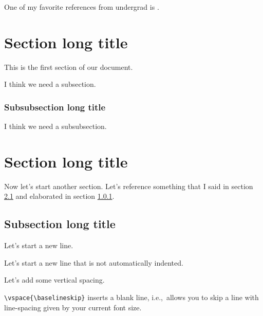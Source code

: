 \documentclass{article}
\begin{document}
\vspace{\baselineskip} %

One of my favorite references from undergrad is \cite{NotSoShortIntro}.

\section[Section short title]{Section long title}

This is the first section of our document.

I think we need a subsection.

\subsubsection[Subsubsec. short title]{Subsubsection long title}\label{MySubsubsection}

I think we need a subsubsection.


\section[Section short title]{Section long title}

Now let's start another section. Let's reference something that I said in section \ref{MySection} and elaborated in section \ref{MySubsubsection}.

\subsection[Subsec. short title]{Subsection long title}\label{MySection}

Let's start a new line. %

\noindent Let's start a new line that is not automatically indented.

Let's add some vertical spacing.

\texttt{\textbackslash vspace\{\textbackslash baselineskip\}} inserts a blank line, i.e.,~allows you to skip a line with line-spacing given by your current font size.

\vspace{\baselineskip} %
\end{document}
